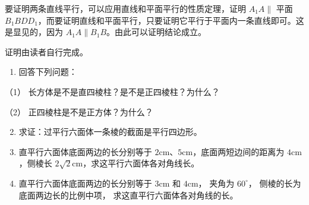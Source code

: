 要证明两条直线平行，可以应用直线和平面平行的性质定理，证明
\(A_{1}A \parallel\) 平面
\(B_{1}BDD_{1}\)，而要证明直线和平面平行，只要证明它平行于平面内一条直线即可。这是显见的，因为
\(A_{1}A \parallel B_{1}B\)。由此可以证明结论成立。

证明由读者自行完成。

\begin{enumerate}
\item
  回答下列问题：
\end{enumerate}

（1） 长方体是不是直四棱柱？是不是正四棱柱？为什么？

（2） 正四棱柱是不是正方体？为什么？

\begin{enumerate}
\setcounter{enumi}{1}
\item
  求证：过平行六面体一条棱的截面是平行四边形。
\item
  直平行六面体底面两边的长分别等于
  \(2\mathrm{cm}\)、\(5\mathrm{cm}\)，底面两短边间的距离为
  \(4\mathrm{cm}\)，侧棱长
  \(2\sqrt{2}\mathrm{cm}\)，求这平行六面体各对角线长。
\item
  直平行六面体底面两边的长分别等于 \(3\mathrm{cm}\) 和
  \(4\mathrm{cm}\)， 夹角为 \(60^{\circ}\)，
  侧棱的长为底面两边长的比例中项， 求这直平行六面体各对角线的长。
\end{enumerate}


